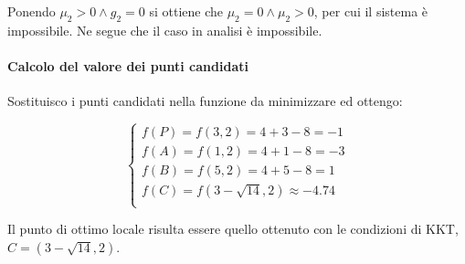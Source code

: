 \documentclass[\main/main.tex]{subfiles}
\begin{document}
Ponendo $\mu_2 > 0 \land g_2 = 0$ si ottiene che $\mu_2 = 0 \land \mu_2 > 0$, per cui il sistema è impossibile. Ne segue che il caso in analisi è impossibile.

\paragraph*{Calcolo del valore dei punti candidati}
Sostituisco i punti candidati nella funzione da minimizzare ed ottengo:

\[
	\begin{cases}
		f(P) = f(3, 2) = 4 + 3 - 8 = -1          \\
		f(A) = f(1,2) =  4 + 1 - 8 = -3          \\
		f(B) = f(5,2) =  4 + 5 - 8 = 1           \\
		f(C) = f(3 - \sqrt{14}, 2) \approx -4.74 \\
	\end{cases}
\]

Il punto di ottimo locale risulta essere quello ottenuto con le condizioni di KKT, $C = (3 - \sqrt{14}, 2)$.
\end{document}
